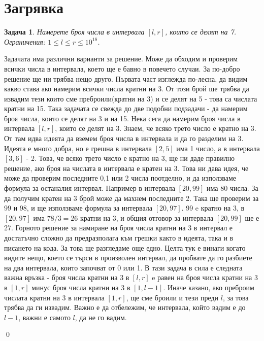 \documentclass[]{article}
\newtheorem{problem}{Задача}
\newenvironment{solution}{\noindent{\bf Решение.}\hspace*{1em}}{\qed\par}
\begin{document}
\section{Загрявка}
\begin{problem}
Намерете броя числа в интервала $[l, r]$, които се делят на 7.\newline
Ограничения: $1\leq l\leq r\leq 10^{18}$.
\end{problem}
\begin{solution}
Задачата има различни варианти за решение.\newline
Може да обходим и проверим всички числа в интервала, което ще е бавно в повечето случаи.\newline
За по-добро решение ще ни трябва нещо друго. Първата част изглежда по-лесна, да видим какво става ако намерим всички числа кратни на 3. От този брой ще трябва да извадим тези които сме преброили(кратни на 3) и се делят на 5 - това са числата кратни на 15. Така задачата се свежда до две подобни подзадачи - да намерим броя числа, които се делят на 3 и на 15.\newline
Нека сега да намерим броя числа в интервала $[l, r]$, които се делят на 3. Знаем, че всяко трето число е кратно на 3. От там идва идеята да вземем броя числа в интервала и да го разделим на 3. Идеята е много добра, но е грешна в интервала $[2,5]$ има 1 число, а в интервала $[3,6]$ - 2. Това, че всяко трето число е кратно на 3, ще ни даде правилно решение, ако броя на числата в интервала е кратен на 3. Това ни дава идея, че може да проверим последните 0,1 или 2 числа поотделно, и да използваме формула за останалия интервал. Например в интервала $[20,99]$ има 80 числа. За да получим кратен на 3 брой може да махнем последните 2. Така ще проверим за 99 и 98, и ще използваме формула за интервала $[20,97]$. 99 e кратно на 3, в $[20,97]$ има $78/3=26$ кратни на 3, и общия отговор за интервала $[20,99]$ ще е 27.\newline
Горното решение за намиране на броя числа кратни на 3 в интервал е достатъчно сложно да предразполага към грешки както в идеята, така и в писането на кода. За това ще разгледаме още едно. Целта тук е винаги когато видите нещо, което се търси в произволен интервал, да пробвате да го разбиете на два интервала, които започват от 0 или 1. В тази задача в сила е следната важна връзка - броя числа кратни на 3 в $[l,r]$ e равен на броя числа кратни на 3 в $[1,r]$ минус броя числа кратни на 3 в $[1,l-1]$. Иначе казано, ако преброим числата кратни на 3 в интервала $[1,r]$, ще сме броили и тези преди $l$, за това трябва да ги извадим. Важно е да отбележим, че интервала, който вадим е до $l-1$, важни е самото $l$, да не го вадим.\newline

\end{solution}
\end{document}
